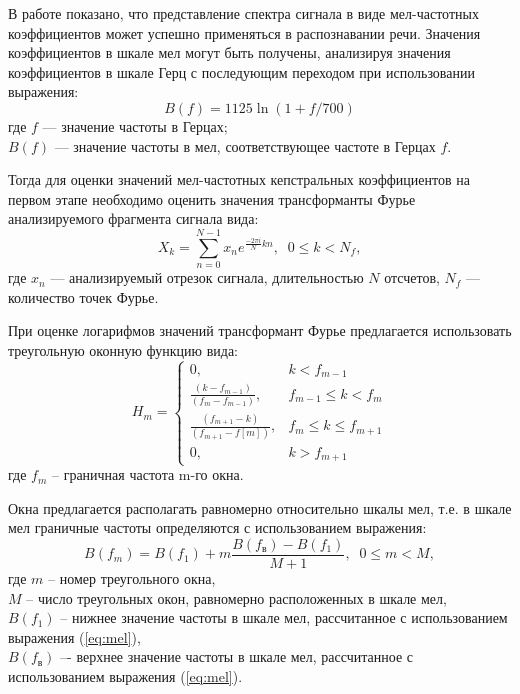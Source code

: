 \documentclass[a4paper,14pt,russian,utf8,nocolumnsxix,nocolumnxxxi,nocolumnxxxii]{eskdtext}
\begin{document}
В работе \cite{davis} показано, что представление спектра сигнала в виде мел-частотных коэффициентов может успешно применяться в распознавании речи. Значения коэффициентов в шкале мел могут быть получены, анализируя значения коэффициентов в шкале Герц с последующим переходом при использовании выражения:
\begin{equation}
	B(f)=1125\ln(1+f/700)
	\label{eq:mel}
\end{equation}
где  $f$ --- значение частоты в Герцах;\\
$B(f)$ --- значение частоты в мел, соответствующее частоте в Герцах $f$.

Тогда для оценки значений мел-частотных кепстральных коэффициентов на первом этапе необходимо оценить значения трансформанты Фурье анализируемого фрагмента сигнала вида:
\begin{equation}
	X_{k} =\sum_{n=0}^{N-1}x_{n}e^{\frac{-2\pi i}{N} kn},  \;\; 0\le k<N_f,
\end{equation}
где  $x_n$ --- анализируемый отрезок сигнала, длительностью $N$ отсчетов, $N_f$ --- количество точек Фурье.

При оценке логарифмов значений трансформант Фурье предлагается использовать треугольную оконную функцию вида:
\begin{equation}
	H_{m}=
	\begin{cases}
		0,&k<f_{m-1}\\ 
		\frac{(k-f_{m-1})}{(f_{m}-f_{m-1})},&f_{m-1} \leq k < f_{m}\\ 
		\frac{(f_{m+1}-k)}{(f_{m+1}-f[m])},&f_{m} \leq k \leq f_{m+1}\\ 
		0,&k > f_{m+1}
	\end{cases}
	\label{eq:window}
\end{equation}
где $f_m$ – граничная частота m-го окна.

Окна предлагается располагать равномерно относительно шкалы мел, т.е. в шкале мел граничные частоты определяются с использованием выражения:
\begin{equation}
B(f_{m})=B(f_1)+m\frac{B(f_{\text{в}})-B(f_{1})}{M+1}, \; \; 0 \leq m < M,
\end{equation}
где $m$ -- номер треугольного окна, \\$M$ -- число треугольных окон, равномерно расположенных в шкале мел,\\ $B(f_1)$ -- нижнее значение частоты в шкале мел, рассчитанное с использованием выражения (\ref{eq:mel}),\\ $B(f_{\text{в}})$ –- верхнее значение частоты в шкале мел, рассчитанное с использованием выражения (\ref{eq:mel}).
\end{document}
